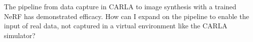 \begin{comment}
Introduction
- Making NeRFs with real data is the usual way to go about generating NeRFs.
- The challenge is in capturing this data from cameras mounted on vehicles, in uncontrolled environment.

How do I expand the pipeline?
- How is the data captured? Introduce the NAPLab-car, the sensors, etc.
- How do I read this data? Mention the Aksel and Mathias' repository.
    - Use FFMPEG to read the .h264-video and serve the frames with a generator-function.
    - Use regex to parse a file with GPS data formatted as NMEA (National Marine Electronics Association) sentences, a standard messages used by GPS (Global Positioning System) receivers to communicate with other devices, such as computers or chartplotters. Each GPS-datapoint is seved with a generator-function the same way as with the video-frames.
    - The camera is synchronized to the closest frame in time to the GPS timestamp using custom code. "- Custom code is used to synchronize the camera to the frame closest in time with the GPS timestamp."
    - After synchronization, I can loop through the synchronized sensor data with a regular loop.
- Premise: Have synchronized image- and GPS-data.
- Create a NAPLabDataParser that implements the same methods as the CarlaDataParser. The main difference is in the implementation of the transform-function. 
- The transformation matrix is created by :
    - Store the initial GPS lat, long and alt, and use it as the reference point.
    - The reference point is utilized in order to convert latitude, longitude, altitude of subsequent GPS-readings to North, East, Down from the observer, i.e. the reference point.
    - NED is then converted to ENU and then to blender coordinate conventions.
    - The rotation is estimated with trigonometry by comparing subsequent GPS-readings.
    - The translation and rotation is combined into a transformation matrix.
- The intrinsics are computed in the same way as discussed in \autoref{sec:carla-to-nerfstudio}.
- The transformation matrix and intrinsics are combined into a transform.json
- The exported transform.json and images are in the same format as the output from the CarlaDataParser, so the following pipeline remains unchanged.
\end{comment}

The pipeline from data capture in CARLA to image synthesis with a trained NeRF has demonstrated efficacy. How can I expand on the pipeline to enable the input of real data, not captured in a virtual environment like the CARLA simulator?

